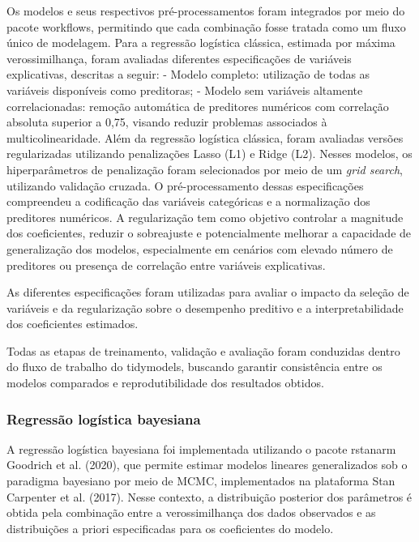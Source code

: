 \documentclass[
  brazilian,
  12pt,
  letterpaper,
  DIV=11,
  numbers=noendperiod]{scrartcl}
\begin{document}
Os modelos e seus respectivos pré-processamentos foram integrados por
meio do pacote workflows, permitindo que cada combinação fosse tratada
como um fluxo único de modelagem. Para a regressão logística clássica,
estimada por máxima verossimilhança, foram avaliadas diferentes
especificações de variáveis explicativas, descritas a seguir: - Modelo
completo: utilização de todas as variáveis disponíveis como preditoras;
- Modelo sem variáveis altamente correlacionadas: remoção automática de
preditores numéricos com correlação absoluta superior a 0,75, visando
reduzir problemas associados à multicolinearidade. Além da regressão
logística clássica, foram avaliadas versões regularizadas utilizando
penalizações Lasso (L1) e Ridge (L2). Nesses modelos, os hiperparâmetros
de penalização foram selecionados por meio de um \emph{grid search},
utilizando validação cruzada. O pré-processamento dessas especificações
compreendeu a codificação das variáveis categóricas e a normalização dos
preditores numéricos. A regularização tem como objetivo controlar a
magnitude dos coeficientes, reduzir o sobreajuste e potencialmente
melhorar a capacidade de generalização dos modelos, especialmente em
cenários com elevado número de preditores ou presença de correlação
entre variáveis explicativas.

As diferentes especificações foram utilizadas para avaliar o impacto da
seleção de variáveis e da regularização sobre o desempenho preditivo e a
interpretabilidade dos coeficientes estimados.

Todas as etapas de treinamento, validação e avaliação foram conduzidas
dentro do fluxo de trabalho do tidymodels, buscando garantir
consistência entre os modelos comparados e reprodutibilidade dos
resultados obtidos.

\subsubsection{Regressão logística
bayesiana}\label{regressuxe3o-loguxedstica-bayesiana-1}

A regressão logística bayesiana foi implementada utilizando o pacote
rstanarm Goodrich et al. (2020), que permite estimar modelos lineares
generalizados sob o paradigma bayesiano por meio de MCMC, implementados
na plataforma Stan Carpenter et al. (2017). Nesse contexto, a
distribuição posterior dos parâmetros é obtida pela combinação entre a
verossimilhança dos dados observados e as distribuições a priori
especificadas para os coeficientes do modelo.
\end{document}

